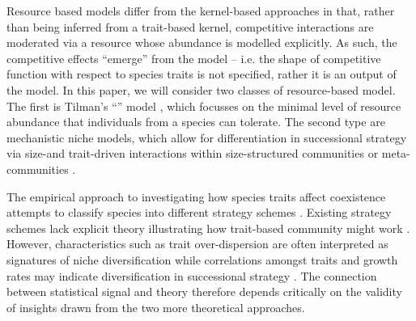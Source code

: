 \documentclass[a4paper,11pt]{article}
\begin{document}
Resource based models differ from the kernel-based approaches in that,
rather than being inferred from a trait-based kernel, competitive
interactions are moderated via a resource whose abundance is modelled
explicitly.  As such, the competitive effects ``emerge'' from the
model -- i.e. the shape of competitive function with respect to
species traits is not specified, rather it is an output of the model.
%
In this paper, we will consider two classes of resource-based model.
%
The first is Tilman's ``\Rstar'' model \citep{Tilman-1977,
  Tilman-1982}, which focusses on the minimal level of resource
abundance that individuals from a species can tolerate.
%
%
The second type are mechanistic niche models, which allow for 
differentiation in successional strategy via size-and
trait-driven interactions within size-structured communities or
meta-communities
\citep{Huston-1987,Kohyama-1993,Moorcroft-2001,Falster-2011}.

The empirical approach to investigating how species traits affect
coexistence attempts to classify species into different strategy
schemes
\citep{Grime-1974,Grime-1979,Southwood-1977,Weiher-1999,Westoby-2002}.
%
%
Existing strategy schemes lack explicit theory illustrating how
trait-based community might work \citep{Adler-2013}.
However, characteristics such as trait over-dispersion are often
interpreted as
signatures of niche diversification \citep[e.g.][]{Kraft-2008} while
correlations amongst traits and growth rates may indicate
diversification in successional strategy \citep[e.g.][]{Wright-2010}.
%
The connection between statistical signal and theory therefore depends
critically on the validity of insights drawn from
the two more theoretical approaches.
\end{document}
